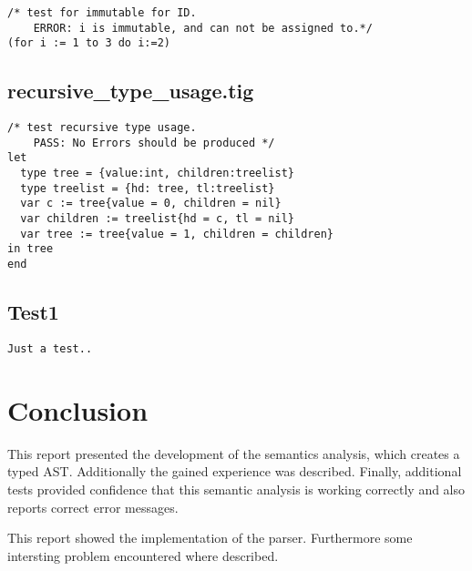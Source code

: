 \documentclass{article}
\begin{document}
\begin{lstlisting}[frame=single]
/* test for immutable for ID.
	ERROR: i is immutable, and can not be assigned to.*/
(for i := 1 to 3 do i:=2)
\end{lstlisting}

\subsection{recursive\_type\_usage.tig}

\begin{lstlisting}[frame=single]
 /* test recursive type usage.
	PASS: No Errors should be produced */
let
  type tree = {value:int, children:treelist}
  type treelist = {hd: tree, tl:treelist}
  var c := tree{value = 0, children = nil}
  var children := treelist{hd = c, tl = nil}
  var tree := tree{value = 1, children = children}
in tree
end
\end{lstlisting}

\subsection{Test1}

\begin{lstlisting}[frame=single]
Just a test..
\end{lstlisting}

\section{Conclusion}
This report presented the development of the semantics analysis, which creates a typed AST. Additionally the gained experience was described. Finally, additional tests provided confidence that this semantic analysis is working correctly and also reports correct error messages.

This report showed the implementation of the parser. Furthermore some intersting problem encountered where described. 
\end{document}
